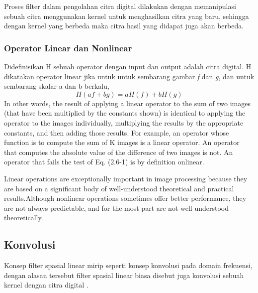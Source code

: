 Proses filter dalam pengolahan citra digital dilakukan dengan memanipulasi sebuah citra menggunakan kernel untuk menghasilkan citra yang baru, sehingga dengan kernel yang berbeda maka citra hasil yang didapat juga akan berbeda. 

\subsubsection{Operator Linear dan Nonlinear}
Didefinisikan H sebuah operator dengan input dan output adalah citra digital. H dikatakan operator linear jika untuk untuk sembarang gambar \textit{f} dan \textit{g}, dan untuk sembarang skalar a dan b berkalu,
\begin{equation}
    \label{eq:linearity-operator}
    H(af + bg) = aH(f) + bH(g)
\end{equation}
In other words, the result of applying a linear operator to the sum of two images (that have been multiplied by the constants shown) is identical to applying the operator to the images individually, multiplying the results by the appropriate constants, and then adding those results. For example, an operator whose function is to compute the sum of K images is a linear operator. An operator that computes the absolute value of the difference of two images is not. An operator that fails the test of Eq. (2.6-1) is by definition  onlinear. 

Linear operations are exceptionally important in image processing because they are based on a significant body of well-understood theoretical and practical results.Although nonlinear operations sometimes offer better performance, they are not always predictable, and for the most part are not well understood theoretically.

\subsection{Konvolusi}
Konsep filter spasial linear mirip seperti konsep konvolusi pada domain frekuensi, dengan alasan tersebut filter spasial linear biasa disebut juga konvolusi sebuah kernel dengan citra digital . 

